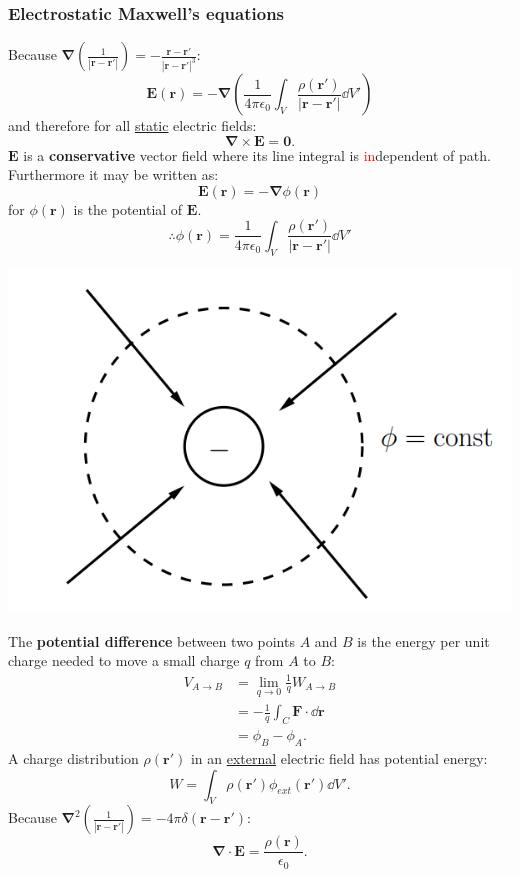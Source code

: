 \documentclass{article}
\newcommand{\vc}[1]{\boldsymbol{#1}}
\begin{document}
\begin{multicols*}{3}
\subsubsection*{Electrostatic Maxwell's equations}
Because $\displaystyle\vc{\nabla}\left(
\frac{1}{|\vc{r}-\vc{r}'|}\right)
=-\frac{\vc{r}-\vc{r}'}{|\vc{r}-\vc{r}'|^3}$:
$$\vc{E}(\vc{r})=-\vc{\nabla}
\left(\frac{1}{4\pi\epsilon_0}
\int_V\frac{\rho(\vc{r}')}{|\vc{r}-\vc{r}'|}\dd V'\right)$$
and therefore for all \underline{static} electric fields:
$$\vc{\nabla}\times\vc{E}=\vc{0}.$$
$\vc{E}$ is a \textbf{conservative} vector field
where its line integral is \textcolor{red}{in}dependent of path.
Furthermore it may be written as:
$$\vc{E}(\vc{r})=-\vc{\nabla}\phi(\vc{r})$$
for $\phi(\vc{r})$ is the potential of $\vc{E}$.
$$\therefore\phi(\vc{r})=\frac{1}{4\pi\epsilon_0}
\int_V\frac{\rho(\vc{r}')}{|\vc{r}-\vc{r}'|}\dd V'$$
\begin{center}
    \includegraphics[scale=0.3]{f01.png}
\end{center}
The \textbf{potential difference} between
two points $A$ and $B$ is the energy per unit charge
needed to move a small charge $q$ from $A$ to $B$:
\begin{align*}
    V_{A\rightarrow B}
    &=\lim_{q\rightarrow0}\frac{1}{q}W_{A\rightarrow B} \\
    &=-\frac{1}{q}\int_C\vc{F}\cdot\dd\vc{r} \\
    &=\phi_B-\phi_A.
\end{align*}
A charge distribution $\rho(\vc{r}')$ in an \underline{external}
electric field has potential energy:
$$W=\int_V\rho(\vc{r}')\phi_{ext}(\vc{r}')\dd V'.$$
Because $\displaystyle\vc{\nabla}^2\left(
\frac{1}{|\vc{r}-\vc{r}'|}\right)=-4\pi\delta(\vc{\vc{r}-\vc{r}'})$:
$$\vc{\nabla}\cdot\vc{E}=\frac{\rho(\vc{r})}{\epsilon_0}.$$


\end{multicols*}
\end{document}
